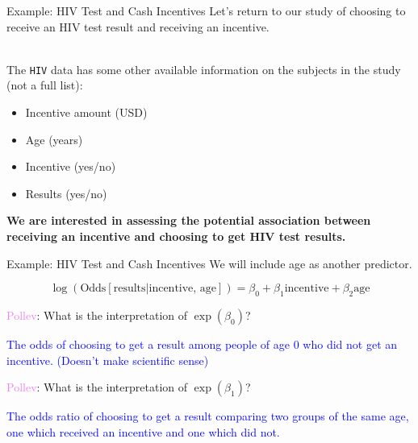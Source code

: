 \documentclass[10pt,t]{beamer}
\begin{document}
\begin{frame}{Example: HIV Test and Cash Incentives}
	Let's return to our study of choosing to receive an HIV test result and receiving an incentive.
	\\ ~\
	
	The \texttt{HIV} data has some other available information on the subjects in the study (not a full list):
	\medskip
	\begin{itemize}
		\item Incentive amount (USD)
		\item Age (years)
		\item Incentive (yes/no)
		\item Results (yes/no)
	\end{itemize}
\medskip  

	\textbf{We are interested in assessing the potential association between receiving an incentive and choosing to get HIV test results.} 
\end{frame}

\begin{frame}{Example: HIV Test and Cash Incentives}
	We will include age as another predictor.
	
	$$\log\left(\text{Odds}[\text{results} |\text{incentive, age}]\right) = \beta_0 + \beta_1 \text{incentive} + \beta_2\text{age}$$

\medskip

\textcolor{violet}{Pollev}: What is the interpretation of $\exp(\beta_0)$?\pause
\bigskip

\textcolor{blue}{The odds of choosing to get a result among people of age 0 who did not get an incentive. (Doesn't make scientific sense)}
\bigskip


\textcolor{violet}{Pollev}: What is the interpretation of $\exp(\beta_1)$?\pause
\bigskip

\textcolor{blue}{The odds ratio of choosing to get a result comparing two groups of the same age, one which received an incentive and one which did not.}

\end{frame}
\end{document}
